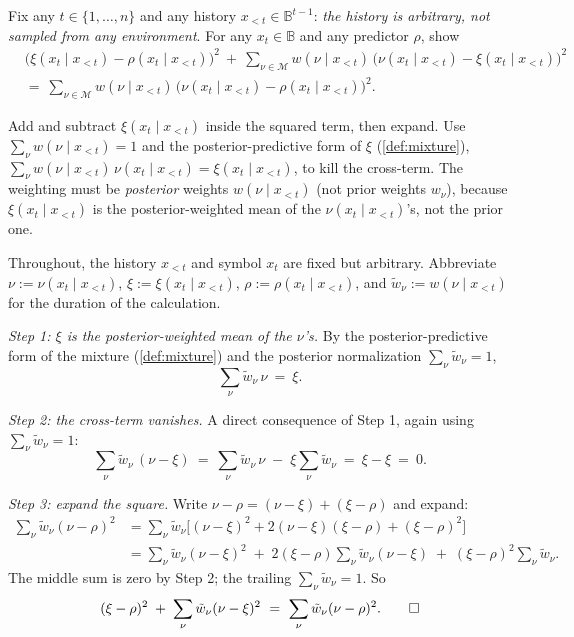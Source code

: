 \documentclass[fontsize=11pt, parskip=half]{scrartcl}
\newcommand{\Mc}{\mathcal{M}}
\begin{document}
\begin{exercise}
\label{prob:sq_pythag}



Fix any $t \in \{1, \dots, n\}$ and any history $x_{<t} \in \mathbb{B}^{t-1}$:
\emph{the history is arbitrary, not sampled from any environment}. For any
$x_t \in \mathbb{B}$ and any predictor $\rho$, show
\begin{align*}
  &\bigl(\xi(x_t \mid x_{<t}) - \rho(x_t \mid x_{<t})\bigr)^{2}
  ~+~
  \sum_{\nu \in \Mc} w(\nu \mid x_{<t})\,\bigl(\nu(x_t \mid x_{<t}) - \xi(x_t \mid x_{<t})\bigr)^{2} \\
  &=~
  \sum_{\nu \in \Mc} w(\nu \mid x_{<t})\,\bigl(\nu(x_t \mid x_{<t}) - \rho(x_t \mid x_{<t})\bigr)^{2}.
\end{align*}

\begin{hint}
Add and subtract $\xi(x_t \mid x_{<t})$ inside the squared term,
then expand. Use $\sum_\nu w(\nu \mid x_{<t}) = 1$ and the posterior-predictive
form of $\xi$ (\cref{def:mixture}), $\sum_\nu w(\nu \mid x_{<t})\,\nu(x_t \mid x_{<t})
= \xi(x_t \mid x_{<t})$, to kill the cross-term. The weighting must be
\emph{posterior} weights $w(\nu \mid x_{<t})$ (not prior weights $w_\nu$),
because $\xi(x_t \mid x_{<t})$ is the posterior-weighted mean of the
$\nu(x_t \mid x_{<t})$'s, not the prior one.
\end{hint}
\end{exercise}

\begin{solution}
Throughout, the history $x_{<t}$ and symbol $x_t$ are fixed but arbitrary.
Abbreviate $\nu := \nu(x_t \mid x_{<t})$, $\xi := \xi(x_t \mid x_{<t})$,
$\rho := \rho(x_t \mid x_{<t})$, and $\tilde w_\nu := w(\nu \mid x_{<t})$ for
the duration of the calculation.

\medskip
\textit{Step 1: $\xi$ is the posterior-weighted mean of the $\nu$'s.}
By the posterior-predictive form of the mixture (\cref{def:mixture}) and the
posterior normalization $\sum_\nu \tilde w_\nu = 1$,
\[
  \sum_\nu \tilde w_\nu \, \nu ~=~ \xi.
\]

\medskip
\textit{Step 2: the cross-term vanishes.}
A direct consequence of Step 1, again using $\sum_\nu \tilde w_\nu = 1$:
\[
  \sum_\nu \tilde w_\nu \, (\nu - \xi)
  ~=~ \sum_\nu \tilde w_\nu \, \nu \;-\; \xi \sum_\nu \tilde w_\nu
  ~=~ \xi - \xi ~=~ 0.
\]

\medskip
\textit{Step 3: expand the square.}
Write $\nu - \rho = (\nu - \xi) + (\xi - \rho)$ and expand:
\begin{align*}
\sum_\nu \tilde w_\nu (\nu - \rho)^2
  &= \sum_\nu \tilde w_\nu\bigl[(\nu - \xi)^2 + 2(\nu - \xi)(\xi - \rho) + (\xi - \rho)^2\bigr] \\
  &= \sum_\nu \tilde w_\nu (\nu - \xi)^2
     \;+\; 2(\xi - \rho)\sum_\nu \tilde w_\nu (\nu - \xi)
     \;+\; (\xi - \rho)^2 \sum_\nu \tilde w_\nu.
\end{align*}
The middle sum is zero by Step 2; the trailing $\sum_\nu \tilde w_\nu = 1$. So
\[
  (\xi - \rho)^2 \;+\; \sum_\nu \tilde w_\nu (\nu - \xi)^2
  ~=~ \sum_\nu \tilde w_\nu (\nu - \rho)^2. \qedhere
\]
\end{solution}
\end{document}

